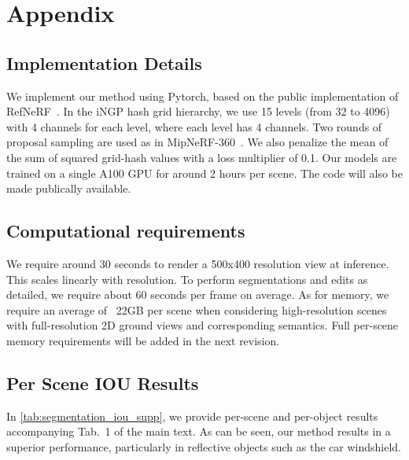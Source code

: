 \section{Appendix} \label{sec:appendix}

\subsection{Implementation Details}

We implement our method using Pytorch, based on the public implementation of RefNeRF~\cite{verbin2022refnerf}. In the iNGP hash grid hierarchy, we use 15 levels (from 32 to 4096) with 4 channels for each level, where each level has 4 channels. Two rounds of proposal sampling are used as in MipNeRF-360~\cite{barron2022mipnerf360}. We also penalize the mean of the sum of squared grid-hash values with a loss multiplier of 0.1. 
Our models are trained on a single A100 GPU for around 2 hours per scene. The code will also be made publically available.

\subsection{Computational requirements}
We require around 30 seconds to render a 500x400 resolution view at inference. This scales linearly with resolution. To perform segmentations and edits as detailed, we require about 60 seconds per frame on average. As for memory, we require an average of ~22GB per scene when considering high-resolution scenes with full-resolution 2D ground views and corresponding semantics. Full per-scene memory requirements will be added in the next revision.


\subsection{Per Scene IOU Results}

In \cref{tab:segmentation_iou_supp}, we provide per-scene and per-object results accompanying Tab.~1 of the main text. As can be seen, our method results in a superior performance, particularly in reflective objects such as the car windshield. 









\clearpage
